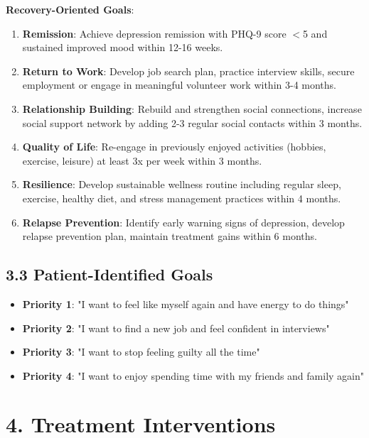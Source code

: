 \documentclass[11pt,letterpaper]{article}
\begin{document}
\textbf{Recovery-Oriented Goals}:
\begin{enumerate}[leftmargin=*]
    \item \textbf{Remission}: Achieve depression remission with PHQ-9 score $<$5 and sustained improved mood within 12-16 weeks.

    \item \textbf{Return to Work}: Develop job search plan, practice interview skills, secure employment or engage in meaningful volunteer work within 3-4 months.

    \item \textbf{Relationship Building}: Rebuild and strengthen social connections, increase social support network by adding 2-3 regular social contacts within 3 months.

    \item \textbf{Quality of Life}: Re-engage in previously enjoyed activities (hobbies, exercise, leisure) at least 3x per week within 3 months.

    \item \textbf{Resilience}: Develop sustainable wellness routine including regular sleep, exercise, healthy diet, and stress management practices within 4 months.

    \item \textbf{Relapse Prevention}: Identify early warning signs of depression, develop relapse prevention plan, maintain treatment gains within 6 months.
\end{enumerate}

\subsection*{3.3 Patient-Identified Goals}

\begin{itemize}[leftmargin=*]
    \item \textbf{Priority 1}: "I want to feel like myself again and have energy to do things"
    \item \textbf{Priority 2}: "I want to find a new job and feel confident in interviews"
    \item \textbf{Priority 3}: "I want to stop feeling guilty all the time"
    \item \textbf{Priority 4}: "I want to enjoy spending time with my friends and family again"
\end{itemize}

\section*{4. Treatment Interventions}
\end{document}
